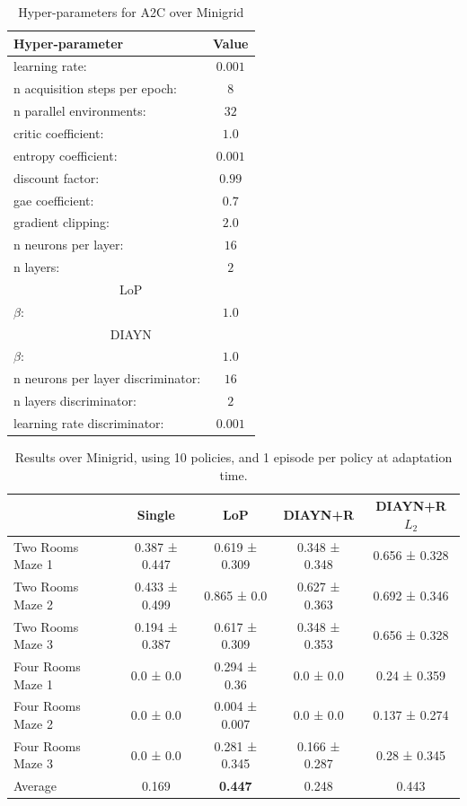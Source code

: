 \begin{table}[h!]
\begin{center}
\begin{tabular}{l|c} \toprule
   \textbf{Hyper-parameter} & \textbf{Value} \\ \hline
    learning rate: &  $0.001$\\
    n acquisition steps per epoch: & $8$ \\
    n parallel environments: &  $32$\\
    critic coefficient: &  $1.0$\\
    entropy coefficient: &  $0.001$\\
    discount factor: &  $0.99$\\
    gae coefficient: &  $0.7$\\
    gradient clipping: & $2.0$ \\ 
    n neurons per layer: & $16$ \\
    n layers: & $2$ \\ \toprule
    \multicolumn{2}{c}{LoP} \\ \hline
    $\beta$: & $1.0$ \\ \toprule
    \multicolumn{2}{c}{DIAYN} \\ \hline
    $\beta$: & $1.0$ \\
    n neurons per layer discriminator: & $16$ \\
    n layers discriminator: & $2$ \\
    learning rate discriminator: & $0.001$ \\ \hline
\end{tabular}
\end{center}
\caption{Hyper-parameters for A2C over Minigrid}
\label{table:hp_minigrid}
\end{table}


\begin{table}[h!]
\begin{center}
    \begin{tabular}{l|c|c|c|c} \toprule
        &	Single	& LoP &	DIAYN+R& 	DIAYN+R $L_2$	\\ \hline

Two Rooms Maze 1	&	0.387 ± 0.447	& 0.619 ± 0.309	& 0.348 ± 0.348	& 0.656 ± 0.328	\\ 
Two Rooms Maze 2	&	0.433 ± 0.499	& 0.865 ± 0.0	& 0.627 ± 0.363	& 0.692 ± 0.346	\\ 
Two Rooms Maze 3	&	0.194 ± 0.387	& 0.617 ± 0.309	& 0.348 ± 0.353	& 0.656 ± 0.328	\\ 
Four Rooms Maze 1	&	0.0 ± 0.0	& 0.294 ± 0.36	& 0.0 ± 0.0	& 0.24 ± 0.359	\\ 
Four Rooms Maze 2	&	0.0 ± 0.0	& 0.004 ± 0.007	& 0.0 ± 0.0	& 0.137 ± 0.274	\\ 
Four Rooms Maze 3	&	0.0 ± 0.0	& 0.281 ± 0.345	& 0.166 ± 0.287	& 0.28 ± 0.345	\\ \hline
Average	&	0.169	& \textbf{0.447}	& 0.248	& 0.443	\\
\hline
\end{tabular}
\caption{Results over Minigrid, using 10 policies, and 1 episode per policy at adaptation time. }
\end{center}
\end{table}

